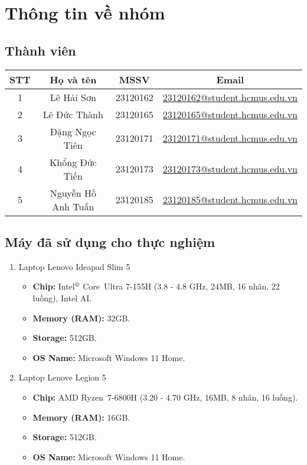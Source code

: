 \section{Thông tin về nhóm}

\subsection{Thành viên}

\centering
\begin{tabular}{|c|c|c|c|}
    \hline
    STT	& Họ và tên	         & MSSV     & Email \\ \hline
    1	& Lê Hải Sơn	     & 23120162 & \href{mailto:23120162@student.hcmus.edu.vn}{23120162@student.hcmus.edu.vn} \\
    2	& Lê Đức Thành	     & 23120165 & \href{mailto:23120165@student.hcmus.edu.vn}{23120165@student.hcmus.edu.vn} \\
    3	& Đặng Ngọc Tiên	 & 23120171 & \href{mailto:23120171@student.hcmus.edu.vn}{23120171@student.hcmus.edu.vn} \\
    4	& Khổng Đức Tiến	 & 23120173 & \href{mailto:23120173@student.hcmus.edu.vn}{23120173@student.hcmus.edu.vn} \\
    5	& Nguyễn Hồ Anh Tuấn & 23120185 & \href{mailto:23120185@student.hcmus.edu.vn}{23120185@student.hcmus.edu.vn} \\
    \hline
\end{tabular}

\raggedright

\subsection{Máy đã sử dụng cho thực nghiệm}

\begin{enumerate}
    \item Laptop Lenovo Ideapad Slim 5
    \begin{itemize}
        \item \textbf{Chip:} Intel$^{\text{\textregistered}}$ Core\texttrademark\ 
        Ultra 7-155H (3.8 - 4.8 GHz, 24MB, 16 nhân, 22 luồng), Intel AI.
        \item \textbf{Memory (RAM):} 32GB.
        \item \textbf{Storage:} 512GB.
        \item \textbf{OS Name:} Microsoft Windows 11 Home.
    \end{itemize}
    
    \item Laptop Lenove Legion 5
    \begin{itemize}
        \item \textbf{Chip:} AMD Ryzen\texttrademark\ 7-6800H (3.20 - 
        4.70 GHz, 16MB, 8 nhân, 16 luồng).
        \item \textbf{Memory (RAM):} 16GB.
        \item \textbf{Storage:} 512GB.
        \item \textbf{OS Name:} Microsoft Windows 11 Home.
    \end{itemize}
\end{enumerate}